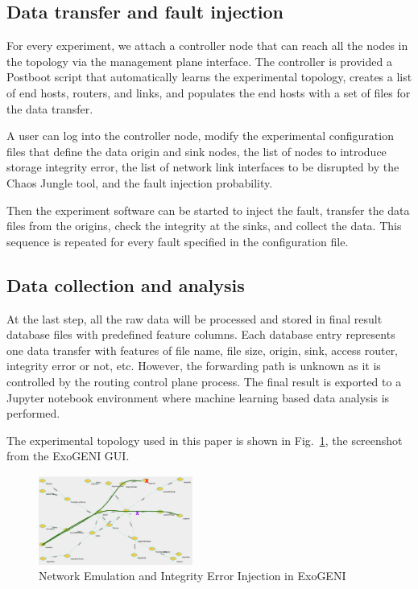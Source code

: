 \subsection{Data transfer and fault injection}
For every experiment, we attach a controller node that can reach all the nodes in the topology via the management plane interface. The controller is provided a Postboot script that automatically learns the experimental topology, creates a list of end hosts, routers, and links, and populates the end hosts with a set of files for the data transfer.

A user can log into the controller node, modify the experimental configuration files that define the data origin and sink nodes, the list of nodes to introduce storage integrity error, the list of network link interfaces to be disrupted by the Chaos Jungle tool, and the fault injection probability.

Then the experiment software can be started to inject the fault, transfer the data files from the origins, check the integrity at the sinks, and collect the data. This sequence is repeated for every fault specified in the configuration file.

\subsection{Data collection and analysis}
At the last step, all the raw data will be processed and stored in final result database files with predefined feature columns. Each database entry represents one data transfer with features of file name, file size, origin, sink, access router, integrity error or not, etc. However, the forwarding path is unknown as it is controlled by the routing control plane process. The final result is exported to a Jupyter notebook environment where machine learning based data analysis is performed.

The experimental topology used in this paper is shown in Fig.~\ref{fig:topology}, the screenshot from the ExoGENI GUI.
\begin{figure}[!ht]
\begin{center}
\includegraphics[width=0.45\textwidth]{./figure/ChaosJungle}
\end{center}
\vspace{-0.05in}
\caption{Network Emulation and Integrity Error Injection in ExoGENI}
\vspace{-0.05in}
\label{fig:topology}
\end{figure}


